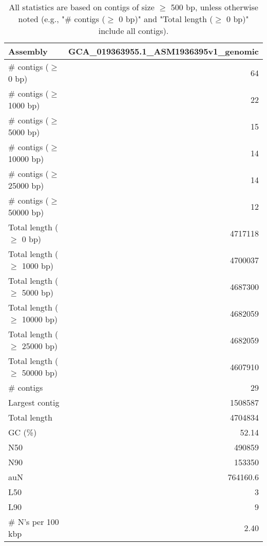 \documentclass[12pt,a4paper]{article}
\begin{document}
\begin{table}[ht]
\begin{center}
\caption{All statistics are based on contigs of size $\geq$ 500 bp, unless otherwise noted (e.g., "\# contigs ($\geq$ 0 bp)" and "Total length ($\geq$ 0 bp)" include all contigs).}
\begin{tabular}{|l*{1}{|r}|}
\hline
Assembly & GCA\_019363955.1\_ASM1936395v1\_genomic \\ \hline
\# contigs ($\geq$ 0 bp) & 64 \\ \hline
\# contigs ($\geq$ 1000 bp) & 22 \\ \hline
\# contigs ($\geq$ 5000 bp) & 15 \\ \hline
\# contigs ($\geq$ 10000 bp) & 14 \\ \hline
\# contigs ($\geq$ 25000 bp) & 14 \\ \hline
\# contigs ($\geq$ 50000 bp) & 12 \\ \hline
Total length ($\geq$ 0 bp) & 4717118 \\ \hline
Total length ($\geq$ 1000 bp) & 4700037 \\ \hline
Total length ($\geq$ 5000 bp) & 4687300 \\ \hline
Total length ($\geq$ 10000 bp) & 4682059 \\ \hline
Total length ($\geq$ 25000 bp) & 4682059 \\ \hline
Total length ($\geq$ 50000 bp) & 4607910 \\ \hline
\# contigs & 29 \\ \hline
Largest contig & 1508587 \\ \hline
Total length & 4704834 \\ \hline
GC (\%) & 52.14 \\ \hline
N50 & 490859 \\ \hline
N90 & 153350 \\ \hline
auN & 764160.6 \\ \hline
L50 & 3 \\ \hline
L90 & 9 \\ \hline
\# N's per 100 kbp & 2.40 \\ \hline
\end{tabular}
\end{center}
\end{table}
\end{document}
